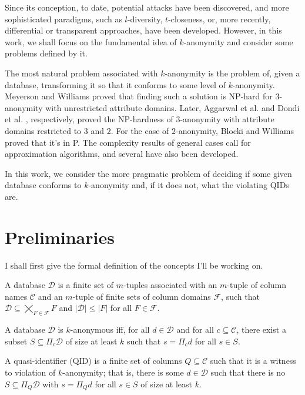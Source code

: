 \documentclass[12pt]{llncs}
\newcommand{\cC}{\mathcal{C}}
\newcommand{\cD}{\mathcal{D}}
\newcommand{\cF}{\mathcal{F}}
\newcommand{\Proj}[1]{\Pi_{#1}}
\begin{document}
Since its conception, to date, potential attacks have been discovered, and more sophisticated paradigms, such as $l$-diversity, $t$-closeness, or, more recently, differential or transparent approaches, have been developed. However, in this work, we shall focus on the fundamental idea of $k$-anonymity and consider some problems defined by it.

The most natural problem associated with $k$-anonymity is the problem of, given a database, transforming it so that it conforms to some level of $k$-anonymity. Meyerson and Williams \cite{Meyerson:2004} proved that finding such a solution is NP-hard for $3$-anonymity with unrestricted attribute domains. Later, Aggarwal et al. \cite{Aggarwal:2005} and Dondi et al. \cite{Dondi:2009}, respectively, proved the NP-hardness of $3$-anonymity with attribute domains restricted to $3$ and $2$. For the case of $2$-anonymity, Blocki and Williams \cite{Blocki:2010} proved that it's in P. The complexity results of general cases call for approximation algorithms, and several have also been developed.

In this work, we consider the more pragmatic problem of deciding if some given database conforms to $k$-anonymity and, if it does not, what the violating QIDs are.

\section{Preliminaries}
I shall first give the formal definition of the concepts I'll be working on.

\begin{definition}
A database $\cD$ is a finite set of $m$-tuples associated with an $m$-tuple of column names $\cC$ and an $m$-tuple of finite sets of column domains $\cF$, such that $\cD \subseteq \bigtimes_{F \in \cF} F$ and $|\cD| \leq |F|$ for all $F \in \cF$.
\end{definition}

\begin{definition}[$k$-anonymity]
A database $\cD$ is $k$-anonymous iff, for all $d \in \cD$ and for all $c \subseteq \cC$, there exist a subset $S \subseteq \Proj{c} \cD$ of size at least $k$ such that $s = \Proj{c} d$ for all $s \in S$.
\end{definition}

\begin{definition}
A quasi-identifier (QID) is a finite set of columns $Q \subseteq \cC$ such that it is a witness to violation of $k$-anonymity; that is, there is some $d \in \cD$ such that there is no $S \subseteq \Proj{Q} \cD$ with $s = \Proj{Q} d$ for all $s \in S$ of size at least $k$.
\end{definition}
\end{document}
